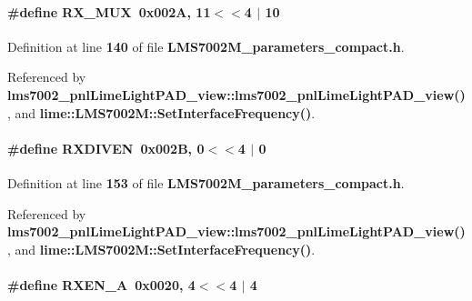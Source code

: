 \paragraph[{R\+X\+\_\+\+M\+UX}]{\setlength{\rightskip}{0pt plus 5cm}\#define R\+X\+\_\+\+M\+UX~0x002\+A, 11$<$$<$4 $\vert$  10}\label{LMS7002M__parameters__compact_8h_acce3a49986d13cef13b22b1492d1f772}


Definition at line {\bf 140} of file {\bf L\+M\+S7002\+M\+\_\+parameters\+\_\+compact.\+h}.



Referenced by {\bf lms7002\+\_\+pnl\+Lime\+Light\+P\+A\+D\+\_\+view\+::lms7002\+\_\+pnl\+Lime\+Light\+P\+A\+D\+\_\+view()}, and {\bf lime\+::\+L\+M\+S7002\+M\+::\+Set\+Interface\+Frequency()}.

\paragraph[{R\+X\+D\+I\+V\+EN}]{\setlength{\rightskip}{0pt plus 5cm}\#define R\+X\+D\+I\+V\+EN~0x002\+B, 0$<$$<$4 $\vert$  0}\label{LMS7002M__parameters__compact_8h_ac3cc4a8f9c2f357c4b127037f6fb539c}


Definition at line {\bf 153} of file {\bf L\+M\+S7002\+M\+\_\+parameters\+\_\+compact.\+h}.



Referenced by {\bf lms7002\+\_\+pnl\+Lime\+Light\+P\+A\+D\+\_\+view\+::lms7002\+\_\+pnl\+Lime\+Light\+P\+A\+D\+\_\+view()}, and {\bf lime\+::\+L\+M\+S7002\+M\+::\+Set\+Interface\+Frequency()}.

\paragraph[{R\+X\+E\+N\+\_\+A}]{\setlength{\rightskip}{0pt plus 5cm}\#define R\+X\+E\+N\+\_\+A~0x0020, 4$<$$<$4 $\vert$  4}\label{LMS7002M__parameters__compact_8h_aec2eeeb483a09574af732cf0aad59feb}


